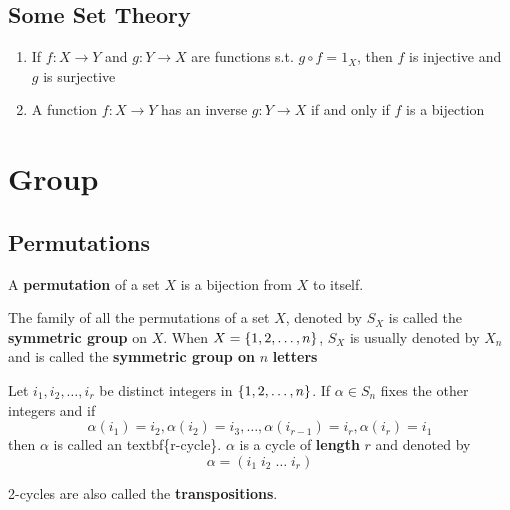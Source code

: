 \documentclass[11pt]{article}
\begin{document}
\subsection{Some Set Theory}
\label{sec:orge5f9213}
\begin{proposition}[]
\label{prop1.47}
\begin{enumerate}
\item If \(f:X\to Y\) and \(g:Y\to X\) are functions s.t. \(g\circ f=1_X\), then
\(f\) is injective and \(g\) is surjective
\item A function \(f:X\to Y\) has an inverse \(g:Y\to X\) if and only if \(f\) is a bijection
\end{enumerate}
\end{proposition}
\section{Group }
\label{sec:org35488b7}
\subsection{Permutations}
\label{sec:orga98c802}
\begin{definition}[]
A \textbf{permutation} of a set \(X\) is a bijection from \(X\) to itself.
\end{definition}


\begin{definition}[]
The family of all the permutations of a set \(X\), denoted by \(S_X\) is called
the \textbf{symmetric group} on \(X\). When \(X=\left\{ 1,2,\dots,n\right\}\), \(S_X\) is
usually denoted by \(X_n\) and is called the \textbf{symmetric group on } \(n\)
\textbf{letters} 
\end{definition}

\begin{definition}[]
Let \(i_1,i_2,\dots,i_r\) be distinct integers in \(\left\{ 1,2,\dots,n\right\}\). If
\(\alpha\in S_n\) fixes the other integers and if
\begin{equation*}
\alpha(i_1)=i_2,\alpha(i_2)=i_3,\dots,\alpha(i_{r-1})=i_r,\alpha(i_r)=i_1
\end{equation*}
then \(\alpha\) is called an textbf\{r-cycle\}. \(\alpha\) is a cycle of
\textbf{length} \(r\) and denoted by
\begin{equation*}
\alpha=(i_1\; i_2\;\dots\; i_r)
\end{equation*}
\end{definition}

2-cycles are also called the \textbf{transpositions}.
\end{document}
